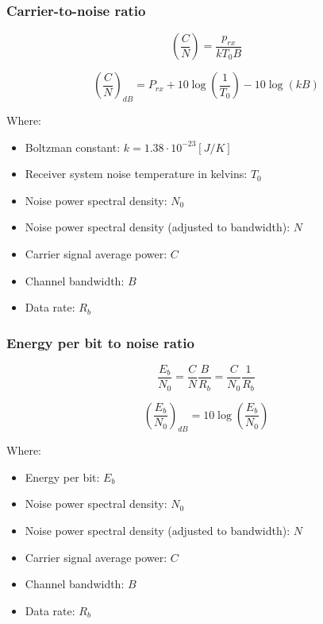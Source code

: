 \documentclass[../main.tex]{subfiles}
\begin{document}
\subsubsection{Carrier-to-noise ratio}

$$
	\left( \frac {C} {N} \right) = \frac {p_{rx}} {k T_0 B}
$$

$$
	\left( \frac {C} {N} \right)_{dB} = P_{rx} + 10 \log \left( \frac {1} {T_0} \right) - 10 \log (k B)
$$

Where:

\begin{itemize}
	\item Boltzman constant: $k = 1.38 \cdot 10^{-23} [J/K]$
	\item Receiver system noise temperature in kelvins: $T_0$
	\item Noise power spectral density: $N_0$
	\item Noise power spectral density (adjusted to bandwidth): $N$
	\item Carrier signal average power: $C$
	\item Channel bandwidth: $B$
	\item Data rate: $R_b$
\end{itemize}

\subsubsection{Energy per bit to noise ratio}

$$
	\frac {E_b} {N_0} = \frac {C} {N} \frac {B} {R_b} = \frac {C} {N_0} \frac {1} {R_b}
$$

$$
	\left( \frac {E_b} {N_0} \right)_{dB} = 10 \log \left( \frac {E_b} {N_0} \right)
$$

Where:

\begin{itemize}
	\item Energy per bit: $E_b$
	\item Noise power spectral density: $N_0$
	\item Noise power spectral density (adjusted to bandwidth): $N$
	\item Carrier signal average power: $C$
	\item Channel bandwidth: $B$
	\item Data rate: $R_b$
\end{itemize}
\end{document}
